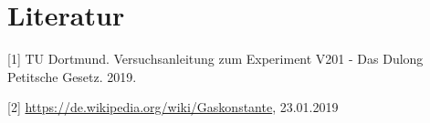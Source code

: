 \section{Literatur}

[1] TU Dortmund. Versuchsanleitung zum Experiment V201 - Das Dulong Petitsche Gesetz. 2019. 

[2] \url{https://de.wikipedia.org/wiki/Gaskonstante}, 23.01.2019